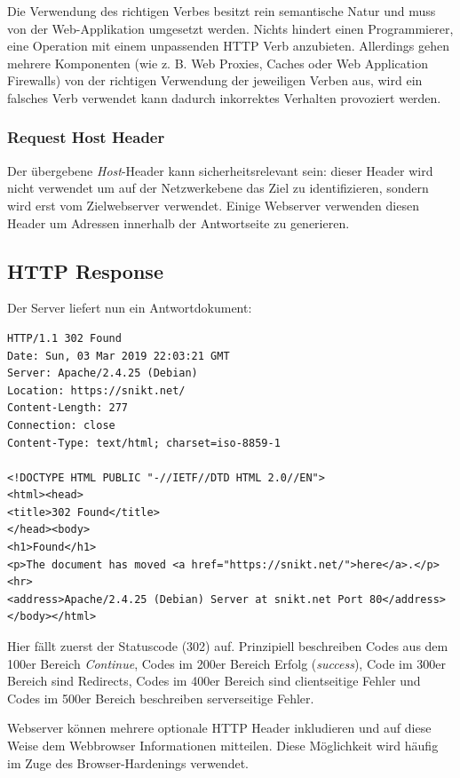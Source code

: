 Die Verwendung des richtigen Verbes besitzt rein semantische Natur und muss von der Web-Applikation umgesetzt werden. Nichts hindert einen Programmierer, eine Operation mit einem unpassenden HTTP Verb anzubieten. Allerdings gehen mehrere Komponenten (wie z. B. Web Proxies, Caches oder Web Application Firewalls) von der richtigen Verwendung der jeweiligen Verben aus, wird ein falsches Verb verwendet kann dadurch inkorrektes Verhalten provoziert werden.

\subsubsection{Request Host Header}

Der übergebene \textit{Host}-Header kann sicherheitsrelevant sein: dieser Header wird nicht verwendet um auf der Netzwerkebene das Ziel zu identifizieren, sondern wird erst vom Zielwebserver verwendet. Einige Webserver verwenden diesen Header um Adressen innerhalb der Antwortseite zu generieren.

\subsection{HTTP Response}

Der Server liefert nun ein Antwortdokument:

\begin{verbatim}
HTTP/1.1 302 Found
Date: Sun, 03 Mar 2019 22:03:21 GMT
Server: Apache/2.4.25 (Debian)
Location: https://snikt.net/
Content-Length: 277
Connection: close
Content-Type: text/html; charset=iso-8859-1

<!DOCTYPE HTML PUBLIC "-//IETF//DTD HTML 2.0//EN">
<html><head>
<title>302 Found</title>
</head><body>
<h1>Found</h1>
<p>The document has moved <a href="https://snikt.net/">here</a>.</p>
<hr>
<address>Apache/2.4.25 (Debian) Server at snikt.net Port 80</address>
</body></html>
\end{verbatim}

Hier fällt zuerst der Statuscode (302) auf. Prinzipiell beschreiben Codes aus dem 100er Bereich \textit{Continue}, Codes im 200er Bereich Erfolg (\textit{success}), Code im 300er Bereich sind Redirects, Codes im 400er Bereich sind clientseitige Fehler und Codes im 500er Bereich beschreiben serverseitige Fehler.

Webserver können mehrere optionale HTTP Header inkludieren und auf diese Weise dem Webbrowser Informationen mitteilen. Diese Möglichkeit wird häufig im Zuge des Browser-Hardenings verwendet.

